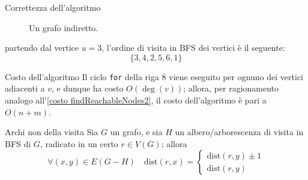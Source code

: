 \documentclass[a4paper, 12pt]{report}
\begin{document}
\begin{framedobs}{Correttezza dell'algoritmo}
\begin{figure}[H]
            \caption{Un grafo indiretto.}
        \end{figure}

        partendo dal vertice $u = 3$, l'ordine di visita in BFS dei vertici è il seguente: $$\{3, 4, 2, 5, 6, 1\}$$

    \end{framedobs}

    \begin{framedobs}{Costo dell'algoritmo}
        Il ciclo \texttt{for} della riga $8$ viene eseguito per ognuno dei vertici adiacenti a $v$, e dunque ha costo $O(\deg(v))$; allora, per ragionamento analogo all'\cref{costo findReachableNodes2}, il costo dell'algoritmo è pari a $O(n +m)$.
    \end{framedobs}

    \begin{framedobs}{Archi non della visita}
        Sia $G$ un grafo, e sia $H$ un albero/arborescenza di visita in BFS di $G$, radicato in un certo $r \in V(G)$; allora $$\forall (x, y) \in E(G - H) \quad \mathrm{dist}(r, x) = \left \{ \begin{array}{l} \mathrm{dist}(r, y) \pm 1 \\ \mathrm{dist}(r, y) \end{array} \right.$$
    \end{framedobs}
\end{document}
